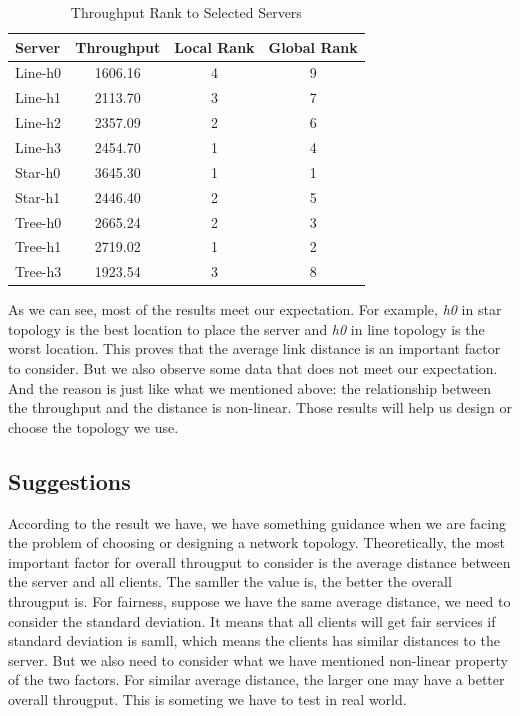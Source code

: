 \begin{table}[ht]
\centering
	\caption{Throughput Rank to Selected Servers}
	\label{table:throughput}
	\begin{tabular}{|l||c|c|c|}
		\hline 
		Server   &  Throughput & Local Rank & Global Rank \\ \hline\hline
		Line-h0  &   1606.16  &  4   &  9 \\ \hline 
		Line-h1  &   2113.70  &  3   &  7 \\ \hline 
		Line-h2  &   2357.09  &  2   &  6 \\ \hline 
		Line-h3  &   2454.70  &  1   &  4 \\ \hline\hline 
		Star-h0  &   3645.30  &  1   &  1 \\ \hline 
        Star-h1  &   2446.40  &  2   &  5 \\ \hline\hline 
		Tree-h0  &   2665.24  &  2   &  3 \\ \hline 
		Tree-h1  &   2719.02  &  1   &  2 \\ \hline 
		Tree-h3  &   1923.54  &  3   &  8 \\ \hline 
	\end{tabular}
\end{table}
As we can see, most of the results meet our expectation. For example, {\it h0} in 
star topology is the best location to place the server and {\it h0} in line topology 
is the worst location. This proves that the average link 
distance is an important factor to consider. But we also observe some data that does not 
meet our expectation. And the reason is just like what we mentioned above: the relationship 
between the throughput and the distance is non-linear. Those results will help
us design or choose the topology we use.

\subsection{Suggestions} \label{subsec:suggestions}
According to the result we have, we have something guidance when we are facing the problem of
choosing or designing a network topology. Theoretically, the most important factor for overall 
througput to consider is the average distance between the server and all clients. The samller 
the value is, the better the overall througput is. For fairness, suppose we have the same 
average distance, we need to consider the standard deviation. It means that all clients will 
get fair services if standard deviation is samll, which means the clients has similar distances 
to the server. But we also need to consider what we have mentioned non-linear property of the two
factors. For similar average distance, the larger one may have a better overall througput. This is 
someting we have to test in real world.

